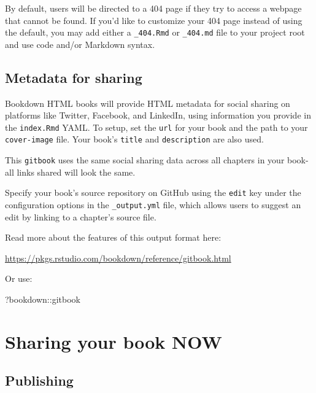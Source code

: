 \documentclass[
]{book}
\newenvironment{Shaded}{\begin{snugshade}}{\end{snugshade}}
\newcommand{\NormalTok}[1]{#1}
\newcommand{\SpecialCharTok}[1]{\textcolor[rgb]{0.00,0.00,0.00}{#1}}
\begin{document}
By default, users will be directed to a 404 page if they try to access a webpage that cannot be found. If you'd like to customize your 404 page instead of using the default, you may add either a \texttt{\_404.Rmd} or \texttt{\_404.md} file to your project root and use code and/or Markdown syntax.

\hypertarget{metadata-for-sharing-1}{%
\section{Metadata for sharing}\label{metadata-for-sharing-1}}

Bookdown HTML books will provide HTML metadata for social sharing on platforms like Twitter, Facebook, and LinkedIn, using information you provide in the \texttt{index.Rmd} YAML. To setup, set the \texttt{url} for your book and the path to your \texttt{cover-image} file. Your book's \texttt{title} and \texttt{description} are also used.

This \texttt{gitbook} uses the same social sharing data across all chapters in your book- all links shared will look the same.

Specify your book's source repository on GitHub using the \texttt{edit} key under the configuration options in the \texttt{\_output.yml} file, which allows users to suggest an edit by linking to a chapter's source file.

Read more about the features of this output format here:

\url{https://pkgs.rstudio.com/bookdown/reference/gitbook.html}

Or use:

\begin{Shaded}
\begin{Highlighting}[]
\NormalTok{?bookdown}\SpecialCharTok{::}\NormalTok{gitbook}
\end{Highlighting}
\end{Shaded}

\hypertarget{sharing-your-book-now}{%
\chapter{Sharing your book NOW}\label{sharing-your-book-now}}

\hypertarget{publishing-2}{%
\section{Publishing}\label{publishing-2}}
\end{document}
